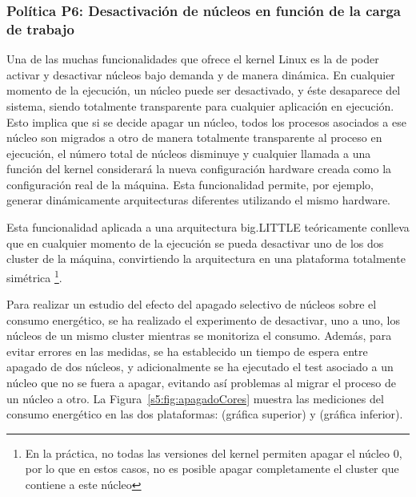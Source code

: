 \subsubsection{Política P6: Desactivación de núcleos en función de la carga
de trabajo}
\label{sec:p6}

Una de las muchas funcionalidades que ofrece el kernel Linux es la de poder
activar y desactivar núcleos bajo demanda y de manera dinámica. En
cualquier momento de la ejecución, un núcleo puede ser desactivado, y éste
desaparece del sistema, siendo totalmente transparente para cualquier
aplicación en ejecución. Esto implica que si se decide apagar un núcleo,
todos los procesos asociados a ese núcleo son migrados a otro de manera
totalmente transparente al proceso en ejecución, el número total de núcleos
disminuye y cualquier llamada a una función del kernel considerará la nueva
configuración hardware creada como la configuración real de la
máquina. Esta funcionalidad permite, por ejemplo, generar dinámicamente
arquitecturas diferentes utilizando el mismo hardware.

Esta funcionalidad aplicada a una arquitectura big.LITTLE teóricamente
conlleva que en cualquier momento de la ejecución se pueda desactivar uno
de los dos cluster de la máquina, convirtiendo la arquitectura en una
plataforma totalmente simétrica \footnote{En la práctica, no todas las
  versiones del kernel permiten apagar el núcleo 0, por lo que en estos
  casos, no es posible apagar completamente el cluster que contiene a este
  núcleo}.

Para realizar un estudio del efecto del apagado selectivo de núcleos sobre
el consumo energético, se ha realizado el experimento de desactivar, uno a
uno, los núcleos de un mismo cluster mientras se monitoriza el
consumo. Además, para evitar errores en las medidas, se ha establecido un
tiempo de espera entre apagado de dos núcleos, y adicionalmente se ha
ejecutado el test asociado a un núcleo que no se fuera a apagar, evitando
así problemas al migrar el proceso de un núcleo a otro. La
Figura~\ref{s5:fig:apagadoCores} muestra las mediciones del consumo
energético en las dos plataformas: \juno (gráfica superior) y \odroid
(gráfica inferior).

